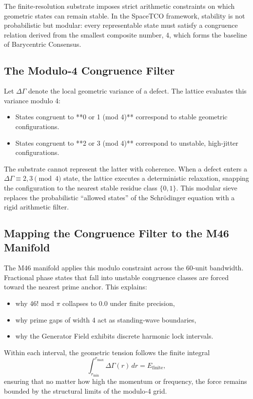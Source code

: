 \documentclass[reprint,amsmath,amssymb,aps,prl,floatfix]{revtex4-2}
\begin{document}
\begin{itemize}
The finite‑resolution substrate imposes strict arithmetic constraints on which geometric states can remain stable. In the SpaceTCO framework, stability is not probabilistic but modular: every representable state must satisfy a congruence relation derived from the smallest composite number, 4, which forms the baseline of Barycentric Consensus.

\subsection{The Modulo‑4 Congruence Filter}

Let \(\Delta\Gamma\) denote the local geometric variance of a defect. The lattice evaluates this variance modulo 4:
\begin{itemize}
\item States congruent to **0 or 1 (mod 4)** correspond to stable geometric configurations.  
\item States congruent to **2 or 3 (mod 4)** correspond to unstable, high‑jitter configurations.
\end{itemize}

The substrate cannot represent the latter with coherence. When a defect enters a \(\Delta\Gamma \equiv 2,3 \pmod{4}\) state, the lattice executes a deterministic relaxation, snapping the configuration to the nearest stable residue class \(\{0,1\}\). This modular sieve replaces the probabilistic “allowed states” of the Schrödinger equation with a rigid arithmetic filter.

\subsection{Mapping the Congruence Filter to the M46 Manifold}

The M46 manifold applies this modulo constraint across the 60‑unit bandwidth. Fractional phase states that fall into unstable congruence classes are forced toward the nearest prime anchor. This explains:

\begin{itemize}
\item why 46! mod \(\pi\) collapses to 0.0 under finite precision,  
\item why prime gaps of width 4 act as standing‑wave boundaries,  
\item why the Generator Field exhibits discrete harmonic lock intervals.
\end{itemize}

Within each interval, the geometric tension follows the finite integral  
\[
\int_{r_{\min}}^{r_{\max}} \Delta\Gamma(r)\,dr = E_{\text{finite}},
\]  
ensuring that no matter how high the momentum or frequency, the force remains bounded by the structural limits of the modulo‑4 grid.


\end{itemize}
\end{document}
